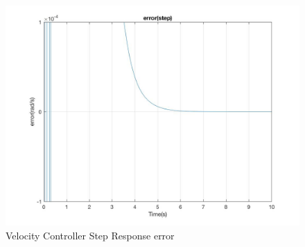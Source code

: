 \documentclass[letterpaper]{article}
\begin{document}
\begin{figure}[H]
\begin{center}
\includegraphics[width = 12cm]{Error(step).jpg}
\caption{Velocity Controller Step Response error}
\label{Velocity_control_step_error}
\end{center}
\end{figure}
\end{document}
